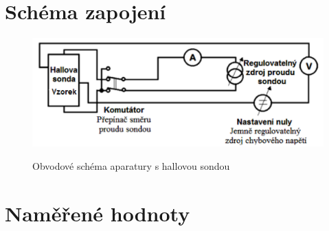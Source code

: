 \documentclass{praktikum}
\begin{document}
\section{Schéma zapojení}
\begin{figure}[H]
\includegraphics[width=\textwidth]{schena}
\label{img:schema}
\caption{Obvodové schéma aparatury s hallovou sondou}
\end{figure}

\newpage

\section{Naměřené hodnoty}
\end{document}
